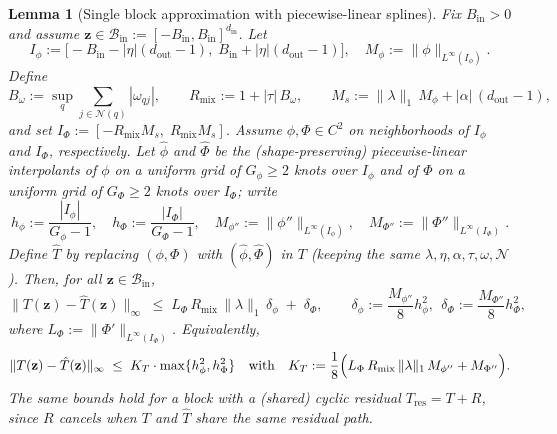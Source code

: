 \documentclass{article}
\theoremstyle{plain}
\newtheorem{lemma}{Lemma}
\theoremstyle{definition}
\theoremstyle{remark}
\begin{document}
\begin{lemma}[Single block approximation with piecewise-linear splines]\label{lem:single_block}
Fix $B_{\mathrm{in}}>0$ and assume $\mathbf{z}\in\mathcal{B}_{\mathrm{in}}:=[-B_{\mathrm{in}},B_{\mathrm{in}}]^{d_{\mathrm{in}}}$. Let
$$I_\phi := \bigl[-B_{\mathrm{in}}-|\eta|(d_{\mathrm{out}}-1),\; B_{\mathrm{in}}+|\eta|(d_{\mathrm{out}}-1)\bigr],
\quad
M_\phi := \|\phi\|_{L^\infty(I_\phi)}.$$
Define
$$B_\omega:=\sup_{q}\sum_{j\in\mathcal{N}(q)}|\omega_{qj}|,
\qquad
R_{\mathrm{mix}}:=1+|\tau|\,B_\omega,
\qquad
M_s := \|\lambda\|_{1}\,M_\phi + |\alpha|\,(d_{\mathrm{out}}-1),$$
and set $I_\Phi := [-R_{\mathrm{mix}}M_s,\; R_{\mathrm{mix}}M_s]$. Assume $\phi,\Phi\in C^2$ on neighborhoods of $I_\phi$ and $I_\Phi$, respectively. Let $\hat\phi$ and $\hat\Phi$ be the (shape-preserving) piecewise-linear interpolants of $\phi$ on a uniform grid of $G_\phi\ge 2$ knots over $I_\phi$ and of $\Phi$ on a uniform grid of $G_\Phi\ge 2$ knots over $I_\Phi$; write
$$h_\phi:=\frac{|I_\phi|}{G_\phi-1},\quad h_\Phi:=\frac{|I_\Phi|}{G_\Phi-1},\quad
M_{\phi''}:=\|\phi''\|_{L^\infty(I_\phi)},\quad M_{\Phi''}:=\|\Phi''\|_{L^\infty(I_\Phi)}.$$
Define $\hat T$ by replacing $(\phi,\Phi)$ with $(\hat\phi,\hat\Phi)$ in $T$ (keeping the same $\lambda,\eta,\alpha,\tau,\omega,\mathcal{N}$). Then, for all $\mathbf{z}\in\mathcal{B}_{\mathrm{in}}$,
\begin{equation}\label{eq:single_block_sup}
\|T(\mathbf{z})-\hat T(\mathbf{z})\|_\infty
\;\le\;
L_\Phi\,R_{\mathrm{mix}}\,\|\lambda\|_{1}\,\delta_\phi\;+\;\delta_\Phi,
\qquad
\delta_\phi:=\frac{M_{\phi''}}{8}h_\phi^2,\ \ \delta_\Phi:=\frac{M_{\Phi''}}{8}h_\Phi^2,
\end{equation}
where $L_\Phi:=\|\Phi'\|_{L^\infty(I_\Phi)}$. Equivalently,
$$\|T(\mathbf{z})-\hat T(\mathbf{z})\|_\infty
\;\le\;
K_T\cdot \max\{h_\phi^2,h_\Phi^2\}
\quad\text{with}\quad
K_T:=\frac{1}{8}\Bigl(L_\Phi\,R_{\mathrm{mix}}\,\|\lambda\|_{1}\,M_{\phi''}+M_{\Phi''}\Bigr).$$
The same bounds hold for a block with a (shared) cyclic residual $T_{\mathrm{res}}=T+R$, since $R$ cancels when $T$ and $\hat T$ share the same residual path.
\end{lemma}
\end{document}
